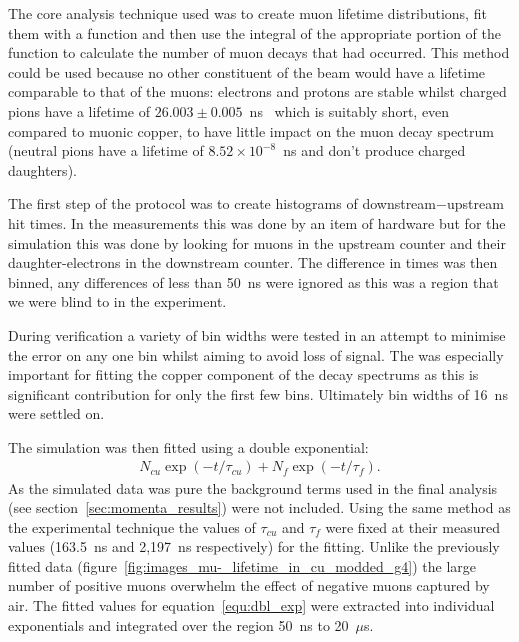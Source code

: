 
The core analysis technique used was to create muon lifetime distributions, fit them with a function and then use the integral of the appropriate portion of the function to calculate the number of muon decays that had occurred. This method could be used because no other constituent of the beam would have a lifetime comparable to that of the muons: electrons and protons are stable whilst charged pions have a lifetime of \(26.003\pm0.005\)~ns~\cite{pdg} which is suitably short, even compared to muonic copper, to have little impact on the muon decay spectrum (neutral pions have a lifetime of \( 8.52\times10^{-8}\)~ns and don't produce charged daughters).

The first step of the protocol was to create histograms of downstream\(-\)upstream hit times. In the measurements this was done by an item of hardware but for the simulation this was done by looking for muons in the upstream counter and their daughter-electrons in the downstream counter. The difference in times was then binned, any differences of less than 50~ns were ignored as this was a region that we were blind to in the experiment.

During verification a variety of bin widths were tested in an attempt to minimise the error on any one bin whilst aiming to avoid loss of signal. The was especially important for fitting the copper component of the decay spectrums as this is significant contribution for only the first few bins. Ultimately bin widths of 16~ns were settled on.

The simulation was then fitted using a double exponential: 
\begin{align}
    N_{cu}\exp(-t/\tau_{cu}) + N_{f}\exp(-t/\tau_{f}). \label{equ:dbl_exp}
\end{align}
As the simulated data was pure the background terms used in the final analysis (see section~\ref{sec:momenta_results}) were not included. Using the same method as the experimental technique the values of \(\tau_{cu}\) and \(\tau_{f}\) were fixed at their measured values (163.5~ns and 2,197~ns respectively) for the fitting. Unlike the previously fitted data (figure~\ref{fig:images_mu-_lifetime_in_cu_modded_g4}) the large number of positive muons overwhelm the effect of negative muons captured by air. The fitted values for equation~\eqref{equ:dbl_exp} were extracted into individual exponentials and integrated over the region 50~ns to 20~\(\mu\)s. 

